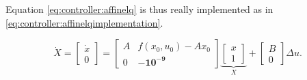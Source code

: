     Equation \eqref{eq:controller:affinelq} is thus really implemented as in \eqref{eq:controller:affinelqimplementation}.

    \begin{equation}
    \label{eq:controller:affinelqimplementation}
        \dot{X} = \left[
        \begin{array}{c}
            \dot{x} \\
            0
        \end{array}\right] =
        \left[
        \begin{array}{cc}
            A & f(x_{0},u_{0})-Ax_{0} \\
            0 & \mathbf{-10^{-9}}
        \end{array}\right]
        \underbrace{\left[
        \begin{array}{c}
            x \\
            1
        \end{array}\right]}_{X}
        +
        \left[
        \begin{array}{c}
            B \\
            0
        \end{array}\right]
        \Delta u.
    \end{equation}
